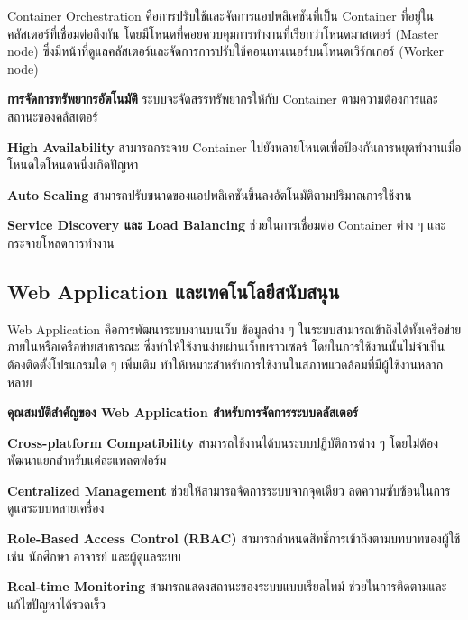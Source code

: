 \hspace*{1.3em} %
Container Orchestration คือการปรับใช้และจัดการแอปพลิเคชันที่เป็น Container ที่อยู่ในคลัสเตอร์ที่เชื่อมต่อถึงกัน โดยมีโหนดที่คอยควบคุมการทำงานที่เรียกว่าโหนดมาสเตอร์ (Master node) ซึ่งมีหน้าที่ดูแลคลัสเตอร์และจัดการการปรับใช้คอนเทนเนอร์บนโหนดเวิร์กเกอร์ (Worker node)

\begin{mycustomitem}
    \item \textbf{การจัดการทรัพยากรอัตโนมัติ} ระบบจะจัดสรรทรัพยากรให้กับ Container ตามความต้องการและสถานะของคลัสเตอร์
    \item \textbf{High Availability} สามารถกระจาย Container ไปยังหลายโหนดเพื่อป้องกันการหยุดทำงานเมื่อโหนดใดโหนดหนึ่งเกิดปัญหา
    \item \textbf{Auto Scaling} สามารถปรับขนาดของแอปพลิเคชันขึ้นลงอัตโนมัติตามปริมาณการใช้งาน
    \item \textbf{Service Discovery และ Load Balancing} ช่วยในการเชื่อมต่อ Container ต่าง ๆ และกระจายโหลดการทำงาน
\end{mycustomitem}
\subsection{Web Application และเทคโนโลยีสนับสนุน}

\hspace*{1.3em} %
Web Application คือการพัฒนาระบบงานบนเว็บ ข้อมูลต่าง ๆ ในระบบสามารถเข้าถึงได้ทั้งเครือข่ายภายในหรือเครือข่ายสาธารณะ ซึ่งทำให้ใช้งานง่ายผ่านเว็บบราวเซอร์ โดยในการใช้งานนั้นไม่จำเป็นต้องติดตั้งโปรแกรมใด ๆ เพิ่มเติม ทำให้เหมาะสำหรับการใช้งานในสภาพแวดล้อมที่มีผู้ใช้งานหลากหลาย

\hspace*{1.3em} %
\textbf{คุณสมบัติสำคัญของ Web Application สำหรับการจัดการระบบคลัสเตอร์}
\begin{mycustomitem}
    \item \textbf{Cross-platform Compatibility} สามารถใช้งานได้บนระบบปฏิบัติการต่าง ๆ โดยไม่ต้องพัฒนาแยกสำหรับแต่ละแพลตฟอร์ม
    \item \textbf{Centralized Management} ช่วยให้สามารถจัดการระบบจากจุดเดียว ลดความซับซ้อนในการดูแลระบบหลายเครื่อง
    \item \textbf{Role-Based Access Control (RBAC)} สามารถกำหนดสิทธิ์การเข้าถึงตามบทบาทของผู้ใช้ เช่น นักศึกษา อาจารย์ และผู้ดูแลระบบ
    \item \textbf{Real-time Monitoring} สามารถแสดงสถานะของระบบแบบเรียลไทม์ ช่วยในการติดตามและแก้ไขปัญหาได้รวดเร็ว
\end{mycustomitem}

